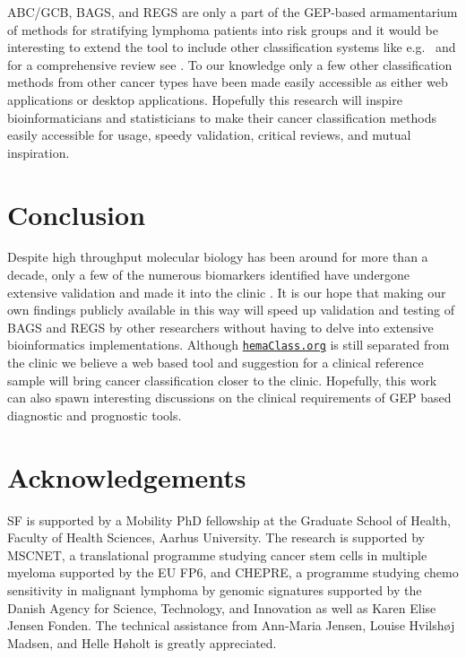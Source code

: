 \documentclass{article}
\newcommand{\hemaClass}{\href{http://hemaClass.org}{\texttt{hemaClass.org}}}
\begin{document}
ABC/GCB, BAGS, and REGS are only a part of the GEP-based armamentarium of methods for stratifying lymphoma patients into risk groups and it would be interesting to extend the tool to include other classification systems like e.g.\ \citep{Shipp2002, Lossos2004a, Malumbres2008} and for a comprehensive review see \citep{Coutinho2013}.
To our knowledge only a few other classification methods from other cancer types have been made easily accessible as either web applications or desktop applications.
Hopefully this research will inspire bioinformaticians and statisticians to make their cancer classification methods easily accessible for usage, speedy validation, critical reviews, and mutual inspiration.

\section{Conclusion}
Despite high throughput molecular biology has been around for more than a decade, only a few of the numerous biomarkers identified have undergone extensive validation and made it into the clinic \citep{Chen2012a}.
It is our hope that making our own findings publicly available in this way will speed up validation and testing of BAGS and REGS by other researchers without having to delve into extensive bioinformatics implementations.
Although \hemaClass{} is still separated from the clinic we believe a web based tool and suggestion for a clinical reference sample will bring cancer classification closer to the clinic.
Hopefully, this work can also spawn interesting discussions on the clinical requirements of GEP based diagnostic and prognostic tools.

{}
\section*{Acknowledgements}
SF is supported by a Mobility PhD fellowship at the Graduate School of Health, Faculty of Health Sciences, Aarhus University.
The research is supported by MSCNET, a translational programme studying cancer stem cells in multiple myeloma supported by the EU FP6, and CHEPRE, a programme studying chemo sensitivity in malignant lymphoma by genomic signatures supported by the Danish Agency for Science, Technology, and Innovation as well as Karen Elise Jensen Fonden.
The technical assistance from Ann-Maria Jensen, Louise Hvilsh{\o}j Madsen, and Helle H{\o}holt is greatly appreciated.
\end{document}
